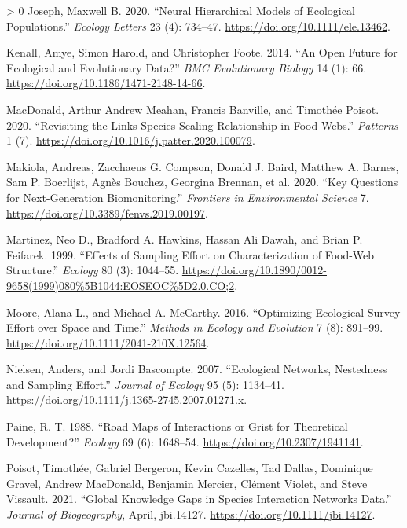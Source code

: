 \documentclass[11pt]{article}
\newlength{\cslhangindent}
\newenvironment{CSLReferences}[3] %
 {%
  \setlength{\parindent}{0pt}
  \ifodd #1 \everypar{\setlength{\hangindent}{\cslhangindent}}\ignorespaces\fi
  \ifnum #2 > 0
  \setlength{\parskip}{#2\baselineskip}
  \fi
 }%
 {}
\begin{document}
\begin{CSLReferences}{1}{0}
\leavevmode\hypertarget{ref-Joseph2020NeuHie}{}%
Joseph, Maxwell B. 2020. {``Neural Hierarchical Models of Ecological
Populations.''} \emph{Ecology Letters} 23 (4): 734--47.
\url{https://doi.org/10.1111/ele.13462}.

\leavevmode\hypertarget{ref-Kenall2014OpeFut}{}%
Kenall, Amye, Simon Harold, and Christopher Foote. 2014. {``An Open
Future for Ecological and Evolutionary Data?''} \emph{BMC Evolutionary
Biology} 14 (1): 66. \url{https://doi.org/10.1186/1471-2148-14-66}.

\leavevmode\hypertarget{ref-MacDonald2020RevLin}{}%
MacDonald, Arthur Andrew Meahan, Francis Banville, and Timothée Poisot.
2020. {``Revisiting the Links-Species Scaling Relationship in Food
Webs.''} \emph{Patterns} 1 (7).
\url{https://doi.org/10.1016/j.patter.2020.100079}.

\leavevmode\hypertarget{ref-Makiola2020KeyQue}{}%
Makiola, Andreas, Zacchaeus G. Compson, Donald J. Baird, Matthew A.
Barnes, Sam P. Boerlijst, Agnès Bouchez, Georgina Brennan, et al. 2020.
{``Key Questions for Next-Generation Biomonitoring.''} \emph{Frontiers
in Environmental Science} 7.
\url{https://doi.org/10.3389/fenvs.2019.00197}.

\leavevmode\hypertarget{ref-Martinez1999EffSam}{}%
Martinez, Neo D., Bradford A. Hawkins, Hassan Ali Dawah, and Brian P.
Feifarek. 1999. {``Effects of Sampling Effort on Characterization of
Food-Web Structure.''} \emph{Ecology} 80 (3): 1044--55.
\url{https://doi.org/10.1890/0012-9658(1999)080\%5B1044:EOSEOC\%5D2.0.CO;2}.

\leavevmode\hypertarget{ref-Moore2016OptEco}{}%
Moore, Alana L., and Michael A. McCarthy. 2016. {``Optimizing Ecological
Survey Effort over Space and Time.''} \emph{Methods in Ecology and
Evolution} 7 (8): 891--99.
\url{https://doi.org/10.1111/2041-210X.12564}.

\leavevmode\hypertarget{ref-Nielsen2007EcoNet}{}%
Nielsen, Anders, and Jordi Bascompte. 2007. {``Ecological Networks,
Nestedness and Sampling Effort.''} \emph{Journal of Ecology} 95 (5):
1134--41. \url{https://doi.org/10.1111/j.1365-2745.2007.01271.x}.

\leavevmode\hypertarget{ref-Paine1988RoaMap}{}%
Paine, R. T. 1988. {``Road Maps of Interactions or Grist for Theoretical
Development?''} \emph{Ecology} 69 (6): 1648--54.
\url{https://doi.org/10.2307/1941141}.

\leavevmode\hypertarget{ref-Poisot2021GloKno}{}%
Poisot, Timothée, Gabriel Bergeron, Kevin Cazelles, Tad Dallas,
Dominique Gravel, Andrew MacDonald, Benjamin Mercier, Clément Violet,
and Steve Vissault. 2021. {``Global Knowledge Gaps in Species
Interaction Networks Data.''} \emph{Journal of Biogeography}, April,
jbi.14127. \url{https://doi.org/10.1111/jbi.14127}.


\end{CSLReferences}
\end{document}
